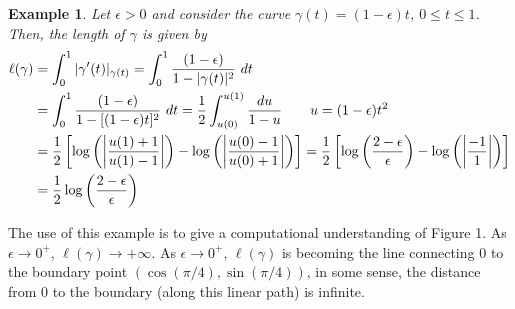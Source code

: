 \documentclass[10pt]{article}
\theoremstyle{plain}
\newtheorem{example}{Example}
\begin{document}
		\begin{example}
			Let $\epsilon > 0$ and consider the curve $\gamma(t) = (1 - \epsilon)t$, $0 \leq t \leq 1$. Then, the length of $\gamma$ is given by
				\begin{align*}
					\ell(\gamma) &= \int_0^1 |\gamma'(t)|_{\gamma(t)} = \int_0^1 \frac{(1 - \epsilon)}{1 - |\gamma(t)|^2} \ dt \\
					&= \int_0^1 \frac{(1 - \epsilon)}{1 - [(1 - \epsilon)t]^2} \ dt = \frac{1}{2}\int_{u(0)}^{u(1)} \frac{du}{1 - u} \qquad u = (1 - \epsilon)t^2 \\ 
					&=  \frac{1}{2} \left[\log \left(\abs{\frac{u(1) + 1}{u(1) - 1}}\right) - \log\left(\abs{\frac{u(0) - 1}{u(0) + 1}}\right)\right] = \frac{1}{2}\left[ \log\left(\frac{2 - \epsilon}{\epsilon}\right) - \log\left(\abs{\frac{-1}{1}}\right) \right]\\
					&= \frac{1}{2} \log \left(\frac{2 - \epsilon}{\epsilon}\right)
				\end{align*} 
			
		\end{example}
		
		The use of this example is to give a computational understanding of Figure 1. As $\epsilon \to 0^+$, $\ell(\gamma) \to +\infty$. As $\epsilon \to 0^+$, $\ell(\gamma)$ is becoming the line connecting $0$ to the boundary point $(\cos(\pi/4), \sin(\pi/4))$, in some sense, the distance from 0 to the boundary (along this linear path) is infinite. 
		
\end{document}
